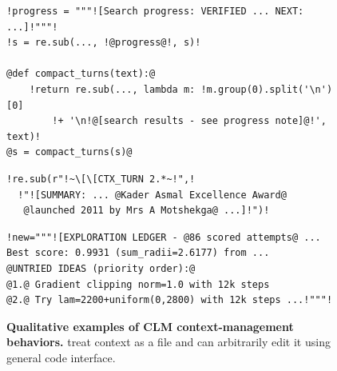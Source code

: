 \begin{figure}[t]
\begin{minipage}[t]{\clmactcolw}
\vspace{4pt}

\begin{lstlisting}[style=clmactstyle]
!progress = """![Search progress: VERIFIED ... NEXT: ...]!"""!
!s = re.sub(..., !@progress@!, s)!

@def compact_turns(text):@
    !return re.sub(..., lambda m: !m.group(0).split('\n')[0]
        !+ '\n!@[search results - see progress note]@!', text)!
@s = compact_turns(s)@
\end{lstlisting}

\vspace{4pt}

\begin{lstlisting}[style=clmactstyle]
!re.sub(r"!~\[\[CTX_TURN 2.*~!",!
  !"![SUMMARY: ... @Kader Asmal Excellence Award@
   @launched 2011 by Mrs A Motshekga@ ...]!")!
\end{lstlisting}
\begin{lstlisting}[style=clmactstyle]
!new="""![EXPLORATION LEDGER - @86 scored attempts@ ...
Best score: 0.9931 (sum_radii=2.6177) from ...
@UNTRIED IDEAS (priority order):@
@1.@ Gradient clipping norm=1.0 with 12k steps
@2.@ Try lam=2200+uniform(0,2800) with 12k steps ...!"""!
\end{lstlisting}
\end{minipage}

\caption{\textbf{Qualitative examples of CLM context-management behaviors.}
\oursplural{} treat context as a file and can arbitrarily edit it using general code interface.
}
\label{fig:clm-examples}
\end{figure}
